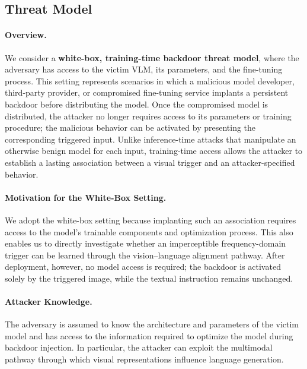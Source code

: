 \documentclass[lettersize,journal]{IEEEtran}
\begin{document}
\subsection{Threat Model}

\paragraph{Overview.}
We consider a \textbf{white-box, training-time backdoor threat model}, where the adversary has access to the victim VLM, its parameters, and the fine-tuning process. This setting represents scenarios in which a malicious model developer, third-party provider, or compromised fine-tuning service implants a persistent backdoor before distributing the model. Once the compromised model is distributed, the attacker no longer requires access to its parameters or training procedure; the malicious behavior can be activated by presenting the corresponding triggered input. Unlike inference-time attacks that manipulate an otherwise benign model for each input, training-time access allows the attacker to establish a lasting association between a visual trigger and an attacker-specified behavior.

\paragraph{Motivation for the White-Box Setting.}
We adopt the white-box setting because implanting such an association requires access to the model's trainable components and optimization process. This also enables us to directly investigate whether an imperceptible frequency-domain trigger can be learned through the vision--language alignment pathway. After deployment, however, no model access is required; the backdoor is activated solely by the triggered image, while the textual instruction remains unchanged.

\paragraph{Attacker Knowledge.}
The adversary is assumed to know the architecture and parameters of the victim model and has access to the information required to optimize the model during backdoor injection. In particular, the attacker can exploit the multimodal pathway through which visual representations influence language generation.
\end{document}
